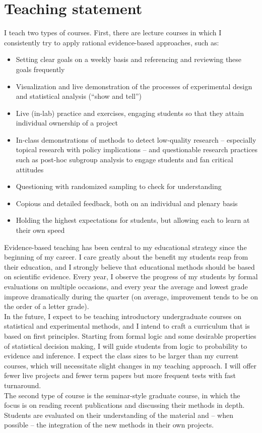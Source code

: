 \newpage
\null
{}

\section*{Teaching statement}
\noindent I teach two types of courses.  First, there are lecture courses in which I consistently try to apply rational evidence-based approaches, such as:
\begin{itemize}
\item Setting clear goals on a weekly basis and referencing and reviewing these goals frequently
\item Visualization and live demonstration of the processes of experimental design and statistical analysis (“show and tell”)
\item Live (in-lab) practice and exercises, engaging students so that they attain individual ownership of a project
\item In-class demonstrations of methods to detect low-quality research – especially topical research with policy implications – and questionable research practices such as post-hoc subgroup analysis to engage students and fan critical attitudes
\item Questioning with randomized sampling to check for understanding
\item Copious and detailed feedback, both on an individual and plenary basis
\item Holding the highest expectations for students, but allowing each to learn at their own speed
\end{itemize}
\noindent Evidence-based teaching has been central to my educational strategy since the beginning of my career.  I care greatly about the benefit my students reap from their education, and I strongly believe that educational methods should be based on scientific evidence.  Every year, I observe the progress of my students by formal evaluations on multiple occasions, and every year the average and lowest grade improve dramatically during the quarter (on average, improvement tends to be on the order of a letter grade).\\

\noindent In the future, I expect to be teaching introductory undergraduate courses on statistical and experimental methods, and I intend to craft a curriculum that is based on first principles.  Starting from formal logic and some desirable properties of statistical decision making, I will guide students from logic to probability to evidence and inference.  I expect the class sizes to be larger than my current courses, which will necessitate slight changes in my teaching approach.  I will offer fewer live projects and fewer term papers but more frequent tests with fast turnaround.\\

\noindent The second type of course is the seminar-style graduate course, in which the focus is on reading recent publications and discussing their methods in depth.  Students are evaluated on their understanding of the material and -- when possible -- the integration of the new methods in their own projects.
